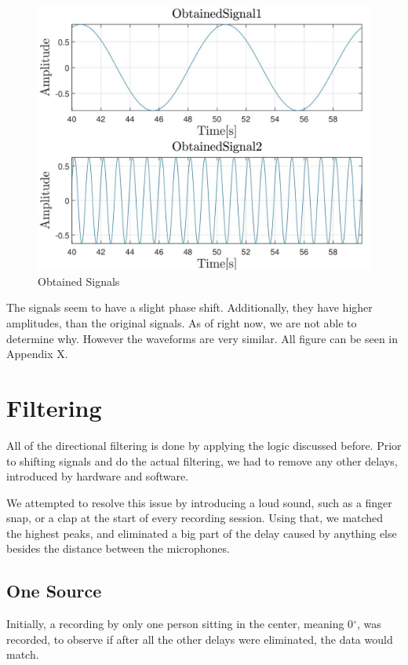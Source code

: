 \begin{figure}[htp]
	\centering
	\includegraphics[width=\textwidth]{Illustrations/obtainedSource1And2.jpg}
	\caption{Obtained Signals}
	\label{fig:obtainedSignals}
\end{figure}

The signals seem to have a slight phase shift. Additionally, they have higher amplitudes, than the original
signals. As of right now, we are not able to determine why. However the waveforms are very similar.
All figure can be seen in Appendix X.
\newpage
\section{Filtering}
All of the directional filtering is done by applying the logic discussed before. Prior to shifting signals 
and do the actual filtering, we had to remove any other delays, introduced by hardware and software.

We attempted to resolve this issue by introducing a loud sound, such as a finger snap, or a clap at the 
start of every recording session. Using that, we matched the highest peaks, and eliminated a big part
of the delay caused by anything else besides the distance between the microphones.

\subsection{One Source}
Initially, a recording by only one person sitting in the center, meaning 0$^\circ$, was recorded, to observe
if after all the other delays were eliminated, the data would match.

